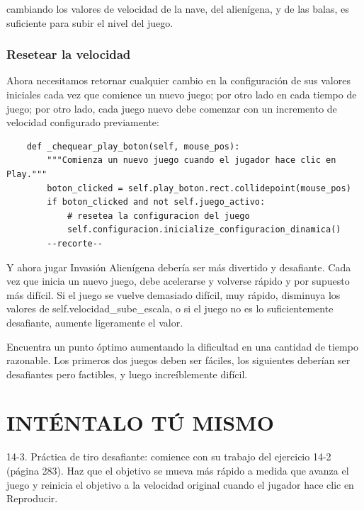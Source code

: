 cambiando los valores de velocidad  de la nave, del alienígena, y de las balas,  es suficiente para subir el nivel del juego. 

\subsubsection{Resetear la velocidad}

Ahora necesitamos retornar cualquier cambio en la configuración de sus valores iniciales cada vez que comience un nuevo juego; 
por otro lado en cada tiempo de juego; por otro lado, cada juego nuevo  debe comenzar con un incremento de velocidad configurado previamente:

\hspace{-2.4cm}{\ttfamily \scriptsize invasión}

\vspace{-0.2cm}
\hspace{-2.1cm}{\ttfamily \scriptsize \_alien.py}\vspace{-0.84cm}
\begin{lstlisting}
    def _chequear_play_boton(self, mouse_pos):
        """Comienza un nuevo juego cuando el jugador hace clic en Play."""
        boton_clicked = self.play_boton.rect.collidepoint(mouse_pos)
        if boton_clicked and not self.juego_activo: 
            # resetea la configuracion del juego
            self.configuracion.inicialize_configuracion_dinamica()
        --recorte--
\end{lstlisting}



Y ahora jugar  Invasión Alienígena debería ser más divertido y desafiante.
Cada vez que inicia un nuevo juego, debe acelerarse y volverse rápido y por supuesto más difícil.
Si el juego se vuelve demasiado difícil, muy  rápido, disminuya los valores de {\ttfamily self.velocidad\_sube\_escala}, o si el juego no es lo suficientemente desafiante, aumente ligeramente el valor. 

Encuentra un punto óptimo aumentando la dificultad en una cantidad de tiempo razonable. Los primeros dos juegos deben ser fáciles, los siguientes deberían ser desafiantes pero factibles, y luego increíblemente difícil.


\section{INTÉNTALO TÚ MISMO}

14-3. Práctica de tiro desafiante: comience con su trabajo del ejercicio 14-2 (página 283). Haz que el objetivo se mueva más rápido a medida que avanza el juego y reinicia el objetivo a la velocidad original cuando el jugador hace clic en Reproducir.\\

